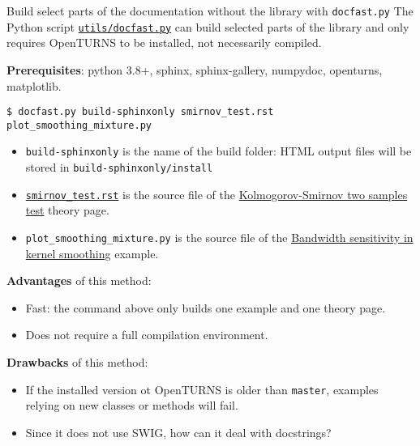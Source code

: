 \documentclass[8pt, handout]{beamer}
\begin{document}
\begin{frame}{Build select parts of the documentation without the library with \texttt{docfast.py}}
The Python script \href{https://github.com/openturns/openturns/blob/master/utils/docfast.py}{\texttt{utils/\alert{docfast.py}}} can build selected parts of the library and only requires OpenTURNS to be installed, not necessarily compiled.

\textbf{Prerequisites}: python 3.8+, sphinx, sphinx-gallery, numpydoc, openturns, matplotlib.

\texttt{\$ docfast.py build-sphinxonly smirnov\_test.rst plot\_smoothing\_mixture.py}

\begin{itemize}
    \item \texttt{build-sphinxonly} is the name of the \alert{build folder}: HTML output files will be stored in \texttt{build-sphinxonly/install}
    \item \href{https://github.com/openturns/openturns/blob/master/python/doc/theory/data_analysis/smirnov_test.rst}{\texttt{smirnov\_test.rst}} is the source file of the \href{https://openturns.github.io/openturns/master/theory/data_analysis/smirnov_test.html}{\alert{Kolmogorov-Smirnov two samples test}} theory page.
    \item \texttt{plot\_smoothing\_mixture.py} is the source file of the
    \href{https://github.com/openturns/openturns/blob/master/python/doc/examples/data_analysis/distribution_fitting/plot_smoothing_mixture.py}{\alert{Bandwidth sensitivity in kernel smoothing}} example.
\end{itemize}

\textbf{Advantages} of this method:
\begin{itemize}
    \item \alert{Fast}: the command above only builds one example and one theory page.
    \item Does \alert{not} require a \alert{full compilation} environment.
\end{itemize}

\textbf{Drawbacks} of this method:
\begin{itemize}
    \item If the installed version ot OpenTURNS is older than \texttt{master}, examples relying on \alert{new classes or methods will fail}.
    \item Since it does not use SWIG, \alert{how can it deal with docstrings?}
\end{itemize}

\end{frame}
\end{document}
